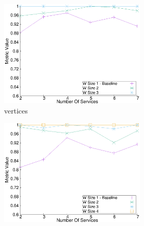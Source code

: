     \begin{figure}[H]
      \centering
      \begin{adjustbox}{minipage=\linewidth,scale=0.75}
        \begin{subfigure}{0.45\textwidth}
          \begin{subfigure}{\textwidth}
            \includegraphics[width=\textwidth]{Images/graphs/window_quality_performance_diff_perce_n7_s7_20_100_n3}
            \caption{ vertices}
            \label{fig:quality_window_wide_perce_n3}
          \end{subfigure}
          \begin{subfigure}{\textwidth}
            \includegraphics[width=\textwidth]{Images/graphs/window_quality_performance_diff_perce_n7_s7_20_100_n4}

\end{subfigure}
\end{subfigure}
\end{adjustbox}
\end{figure}
